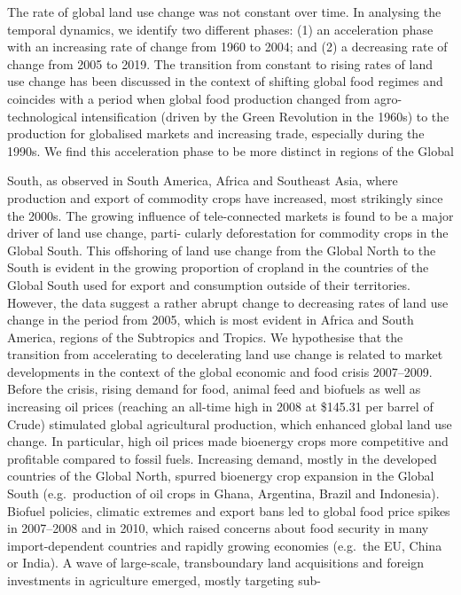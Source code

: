 \documentclass[
]{book}
\begin{document}
The rate of global land use change was not
constant over time. In analysing the temporal dynamics, we
identify two different phases: (1) an acceleration phase with an
increasing rate of change from 1960 to 2004; and (2) a decreasing
rate of change from 2005 to 2019. The transition from
constant to rising rates of land use change has been discussed in
the context of shifting global food regimes and coincides with a
period when global food production changed from agro-
technological intensification (driven by the Green Revolution in
the 1960s) to the production for globalised markets and
increasing trade, especially during the 1990s. We find this
acceleration phase to be more distinct in regions of the Global

South, as observed in South America, Africa and Southeast Asia,
where production and export of commodity crops
have increased, most strikingly since the 2000s.
The growing influence of tele-connected
markets is found to be a major driver of land use change, parti-
cularly deforestation for commodity crops in the Global South.
This offshoring of land use change from the Global North to the
South is evident in the growing proportion of cropland in the
countries of the Global South used for export and consumption
outside of their territories.
However, the data suggest a rather abrupt change to decreasing
rates of land use change in the period from 2005, which is most
evident in Africa and South America, regions of the
Subtropics and Tropics. We
hypothesise that the transition from accelerating to decelerating
land use change is related to market developments in the context
of the global economic and food crisis 2007--2009. Before the
crisis, rising demand for food, animal feed and biofuels as well as
increasing oil prices (reaching an all-time high in 2008 at \$145.31
per barrel of Crude) stimulated global agricultural production,
which enhanced global land use change. In particular, high oil
prices made bioenergy crops more competitive and profitable
compared to fossil fuels. Increasing demand, mostly in the
developed countries of the Global North, spurred bioenergy crop
expansion in the Global South (e.g.~production of oil crops in
Ghana, Argentina, Brazil and Indonesia).
Biofuel policies, climatic extremes and export bans led to
global food price spikes in 2007--2008 and in 2010, which
raised concerns about food security in many import-dependent
countries and rapidly growing economies (e.g.~the EU, China or
India). A wave of large-scale, transboundary land acquisitions and
foreign investments in agriculture emerged, mostly targeting sub-
\end{document}
